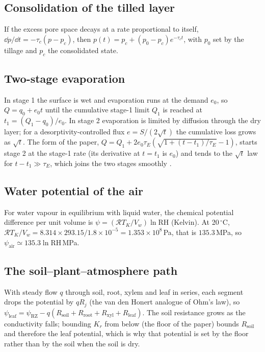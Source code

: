 \subsection{Consolidation of the tilled layer}
If the excess pore space decays at a rate proportional to itself, $\dd p/\dd t=-\tau_c(p-p_c)$, then $p(t)=p_c+(p_0-p_c)e^{-\tau_ct}$, with $p_0$ set by the tillage and $p_c$ the consolidated state.

\subsection{Two-stage evaporation}
In stage 1 the surface is wet and evaporation runs at the demand $e_0$, so $Q=q_0+e_0t$ until the cumulative stage-1 limit $Q_1$ is reached at $t_1=(Q_1-q_0)/e_0$. In stage 2 evaporation is limited by diffusion through the dry layer; for a desorptivity-controlled flux $e=S/(2\sqrt{t})$ the cumulative loss grows as $\sqrt t$. The form of the paper, $Q=Q_1+2e_0\tau_E(\sqrt{1+(t-t_1)/\tau_E}-1)$, starts stage 2 at the stage-1 rate (its derivative at $t=t_1$ is $e_0$) and tends to the $\sqrt t$ law for $t-t_1\gg\tau_E$, which joins the two stages smoothly \citep{Ritchie1972,Philip1957}.

\subsection{Water potential of the air}
For water vapour in equilibrium with liquid water, the chemical potential difference per unit volume is $\psi=(\mathcal R T_K/V_w)\ln\mathrm{RH}$ (Kelvin). At 20\,$^\circ$C, $\mathcal RT_K/V_w=8.314\times293.15/1.8\times10^{-5}=1.353\times10^{8}$\,Pa, that is $135.3$\,MPa, so $\psi_{\mathrm{air}}\simeq135.3\ln\mathrm{RH}$\,MPa.

\subsection{The soil--plant--atmosphere path}
With steady flow $q$ through soil, root, xylem and leaf in series, each segment drops the potential by $qR_j$ (the van den Honert analogue of Ohm's law), so $\psi_{\mathrm{leaf}}=\psi_{\mathrm{RZ}}-q(R_{\mathrm{soil}}+R_{\mathrm{root}}+R_{\mathrm{xyl}}+R_{\mathrm{leaf}})$. The soil resistance grows as the conductivity falls; bounding $K_r$ from below (the floor of the paper) bounds $R_{\mathrm{soil}}$ and therefore the leaf potential, which is why that potential is set by the floor rather than by the soil when the soil is dry.

